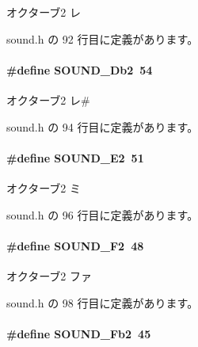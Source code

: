 オクターブ2 レ 



 sound.\+h の 92 行目に定義があります。

\paragraph[{S\+O\+U\+N\+D\+\_\+\+Db2}]{\setlength{\rightskip}{0pt plus 5cm}\#define S\+O\+U\+N\+D\+\_\+\+Db2~54}\label{sound_8h_a7d2839cfd7ade12ff92a685da8405db3_a7d2839cfd7ade12ff92a685da8405db3}


オクターブ2 レ\# 



 sound.\+h の 94 行目に定義があります。

\paragraph[{S\+O\+U\+N\+D\+\_\+\+E2}]{\setlength{\rightskip}{0pt plus 5cm}\#define S\+O\+U\+N\+D\+\_\+\+E2~51}\label{sound_8h_a52d7912c62673a809f44656740543ba5_a52d7912c62673a809f44656740543ba5}


オクターブ2 ミ 



 sound.\+h の 96 行目に定義があります。

\paragraph[{S\+O\+U\+N\+D\+\_\+\+F2}]{\setlength{\rightskip}{0pt plus 5cm}\#define S\+O\+U\+N\+D\+\_\+\+F2~48}\label{sound_8h_a5efc510793cd609c997915070db58dd0_a5efc510793cd609c997915070db58dd0}


オクターブ2 ファ 



 sound.\+h の 98 行目に定義があります。

\paragraph[{S\+O\+U\+N\+D\+\_\+\+Fb2}]{\setlength{\rightskip}{0pt plus 5cm}\#define S\+O\+U\+N\+D\+\_\+\+Fb2~45}\label{sound_8h_a1aa4dea5958d3b0a7c9ff406073fdd37_a1aa4dea5958d3b0a7c9ff406073fdd37}



